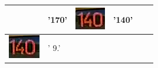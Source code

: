 \begin{table}[h!]
\begin{tabular}{ | c | l | c | l | c | l | }
\begin{minipage}{.2\textwidth}
    \end{minipage}
    &
    '170'
    &
    \begin{minipage}{.2\textwidth}
      \includegraphics[width=\textwidth]{img/exp_number_f03}
    \end{minipage}
    &
    '140'
    \\
    \hline
    \begin{minipage}{.2\textwidth}
      \includegraphics[width=\textwidth]{img/exp_number_f04}
    \end{minipage}
    &
    ' 9.'
    &
    \begin{minipage}{.2\textwidth}

\end{minipage}
\end{tabular}
\end{table}
